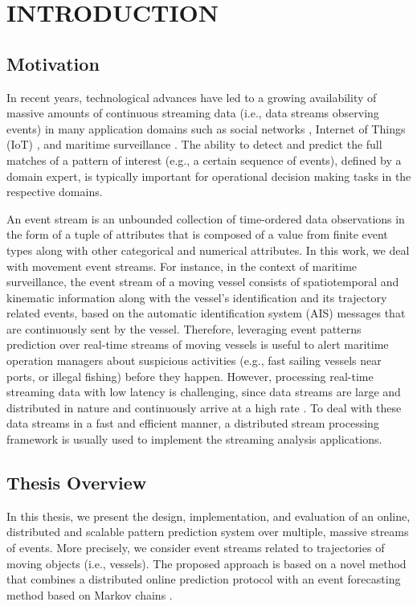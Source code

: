 \chapter{INTRODUCTION}


\section{Motivation}
\par In recent years, technological advances have led to a growing availability of massive amounts of continuous streaming data (i.e., data streams observing events) in many application domains such as social networks \cite{mathioudakis2010twittermonitor}, Internet of Things (IoT) \cite{miorandi2012internet}, and maritime surveillance \cite{patroumpas2015event}.  The ability to detect and predict the full matches of a pattern of interest (e.g., a certain sequence of events), defined by a domain expert, is typically important for operational decision making tasks in the respective domains.

\par An event stream is an unbounded collection of time-ordered data observations in the form of a tuple of attributes that is composed of a value from finite event types along with other categorical and numerical attributes. In this work, we deal with movement event streams. For instance, in the context of maritime surveillance, the event stream of a moving vessel consists of spatiotemporal and kinematic information along with the vessel's identification and its trajectory related events, based on the automatic identification system (AIS) \cite{ais} messages that are continuously sent by the vessel. Therefore, leveraging event patterns prediction over real-time streams of moving vessels is useful to alert maritime operation managers about suspicious activities (e.g., fast sailing vessels near ports, or illegal fishing) before they happen. However, processing real-time streaming data with low latency is challenging, since data streams are large and distributed in nature and continuously arrive at a high rate \cite{Babcock2002,Flouris2017}. To deal with these data streams in a fast and efficient manner, a distributed stream processing framework \cite{Spark,Flink,Storm} is usually used to implement the streaming analysis applications. 

\section{Thesis Overview}
\par In this thesis, we present the design, implementation, and evaluation  of an online, distributed and scalable pattern prediction system over multiple, massive streams of events. More precisely, we consider event streams related to trajectories of moving objects (i.e., vessels). The proposed approach is based on a novel method that combines a distributed online prediction protocol \cite{dekel2012optimal,kamp2014communication} with an event forecasting method based on Markov chains \cite{alevizos2017event}. 


